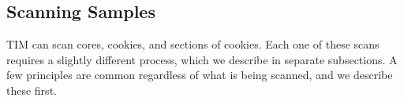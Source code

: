 \documentclass[a4paper,12pt]{article}
\begin{document}
\subsection{Scanning Samples} %

TIM can scan cores, cookies, and sections of cookies. Each one of these scans requires a slightly different process, which we describe in separate subsections.
A few principles are common regardless of what is being scanned, and we describe these first. 



\end{document}
